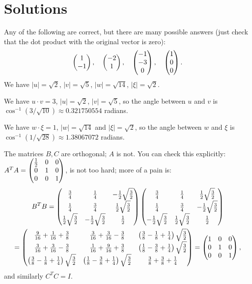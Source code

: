 \documentclass{article}
\begin{document}
\section{Solutions}


\begin{Solution}\label{sol:exr:orth}
Any of the following are correct, but there are many possible
answers (just check that the dot product with the original vector is
zero): \[\begin{pmatrix} 1 \\ -1\end{pmatrix},\quad \begin{pmatrix} -2 \\ 1\end{pmatrix},\quad \begin{pmatrix} -1 \\ -3
\\ 0\end{pmatrix}, \quad \begin{pmatrix} 1 \\ 0 \\ 0\end{pmatrix}.\]
We have \(|u|=\sqrt{2}\), \(|v|=\sqrt{5}\), \(|w|=\sqrt{14}\),
\(|\xi|=\sqrt{2}\).


\end{Solution}
\begin{Solution}
We have \(u\cdot v=3\), \(|u|=\sqrt{2}\), \(|v|=\sqrt{5}\), so the
angle between \(u\) and \(v\) is \(\cos^{-1}(3/\sqrt{10})\approx
0.321750554\) radians.


We have \(w\cdot\xi=1\), \(|w|=\sqrt{14}\) and \(|\xi|=\sqrt{2}\),
so the angle between \(w\) and \(\xi\) is
\(\cos^{-1}(1/\sqrt{28})\approx 1.38067072\) radians.


\end{Solution}
\begin{Solution}
The matrices \(B,C\) are orthogonal; \(A\) is not. You can check
this explicitly: \(A^TA=\begin{pmatrix} \frac{1}{2} & 0 & 0 \\ 0 & 1 & 0 \\ 0 &
0 & 1\end{pmatrix}\), is not too hard; more of a pain
is: \begin{gather*}B^TB=\begin{pmatrix} \frac{3}{4} & \frac{1}{4} &
-\frac{1}{2}\sqrt{\frac{3}{2}} \\ \frac{1}{4} & \frac{3}{4} &
\frac{1}{2}\sqrt{\frac{3}{2}} \\ \frac{1}{2}\sqrt{\frac{3}{2}} &
-\frac{1}{2}\sqrt{\frac{3}{2}} & \frac{1}{2} \end{pmatrix}\begin{pmatrix} \frac{3}{4} &
\frac{1}{4} & \frac{1}{2}\sqrt{\frac{3}{2}} \\ \frac{1}{4} &
\frac{3}{4} & -\frac{1}{2}\sqrt{\frac{3}{2}}
\\ -\frac{1}{2}\sqrt{\frac{3}{2}} & \frac{1}{2}\sqrt{\frac{3}{2}} &
\frac{1}{2} \end{pmatrix}\\
=\begin{pmatrix}\frac{9}{16}+\frac{1}{16}+\frac{3}{8} &
\frac{3}{16}+\frac{3}{16}-\frac{3}{8} &
\left(\frac{3}{8}-\frac{1}{8}+\frac{1}{4}\right)\sqrt{\frac{3}{2}}
\\ \frac{3}{16}+\frac{3}{16}-\frac{3}{8} &
\frac{1}{16}+\frac{9}{16}+\frac{3}{8} &
\left(\frac{1}{8}-\frac{3}{8}+\frac{1}{4}\right)\sqrt{\frac{3}{2}}
\\ \left(\frac{3}{8}-\frac{1}{8}+\frac{1}{4}\right)\sqrt{\frac{3}{2}}
& \left(\frac{1}{8}-\frac{3}{8}+\frac{1}{4}\right)\sqrt{\frac{3}{2}}
& \frac{3}{8}+\frac{3}{8}+\frac{1}{4}\end{pmatrix} =\begin{pmatrix} 1 & 0 & 0 \\ 0 & 1 & 0
\\ 0 & 0 & 1\end{pmatrix},\end{gather*} and similarly \(C^TC=I\).


\end{Solution}
\end{document}
